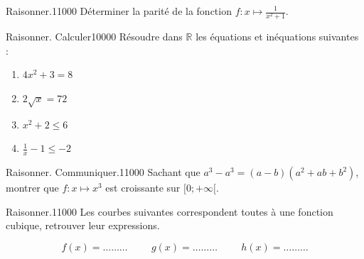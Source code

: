 \begin{pageParcourst} %

\begin{ExoCtN}{Raisonner.}{1}{1}{0}{0}{0}
Déterminer la parité de la fonction $f:x\mapsto \frac{1}{x^2+1}$.

\end{ExoCtN}

\begin{ExoCtN}{Raisonner. Calculer}{1}{0}{0}{0}{0}
 Résoudre dans $\mathbb{R}$ les équations et inéquations suivantes :

\begin{enumerate}
\item $4x^2+3=8$
\item $2\sqrt{x}=72$
\item $x^2+2\leq 6$
\item $\frac{1}{x}-1\leq-2$
\end{enumerate}
\end{ExoCtN}

\begin{ExoCtN}{Raisonner. Communiquer.}{1}{1}{0}{0}{0}
Sachant que $a^3-a^3=(a-b)(a^2+ab+b^2)$, montrer que $f:x\mapsto x^3$ est croissante sur $[0;+\infty[$.\vspace{.2cm}

 
\end{ExoCtN}

\begin{ExoCtN}{Raisonner.}{1}{1}{0}{0}{0}
Les courbes suivantes correspondent toutes à une fonction cubique, retrouver leur expressions.

\[f(x)=\ldots\ldots\ldots\hspace{1cm}g(x)=\ldots\ldots\ldots\hspace{1cm}h(x)=\ldots\ldots\ldots\]


\end{ExoCtN}
\end{pageParcourst}
